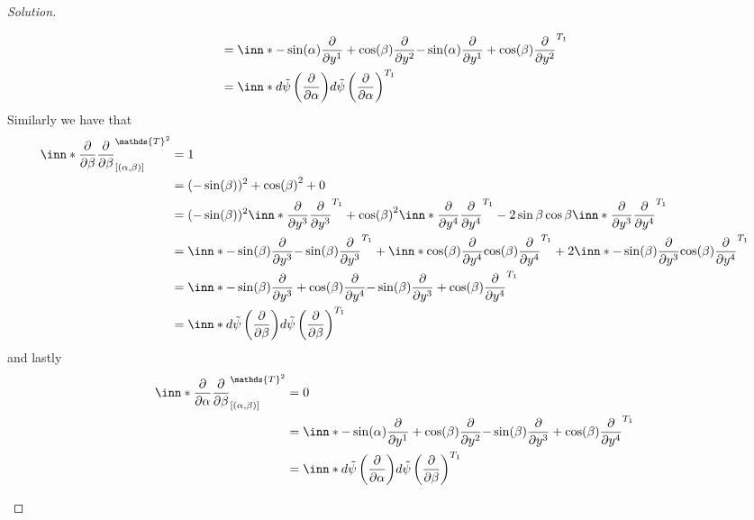 \documentclass[a4paper]{article}
\begin{document}
\begin{proof}[Solution]
\begin{enumerate}[(a)]
\[\begin{aligned}
                                                                              &= \inn*{-\sin(\alpha) \pdv{y^1} + \cos(\beta) \pdv{y^2}}{-\sin(\alpha) \pdv{y^1} + \cos(\beta) \pdv{y^2}}^{T_1} \\
                                                                              &= \inn*{d \tilde{\psi} \left( \pdv{\alpha} \right)}{d \tilde{\psi}\left( \pdv{\alpha}\right)}^{T_1}
        \end{aligned}
      \]
      Similarly we have that
      \[
        \begin{aligned}
          \inn*{\pdv{\beta}}{\pdv{\beta}}_{[(\alpha,\beta)]}^{\mathds{T}^2} &= 1 \\
                                                                              &= (-\sin(\beta))^2 + \cos(\beta)^2 + 0 \\
                                                                              &= (-\sin(\beta))^2\inn*{\pdv{y^3}}{\pdv{y^3}}^{T_1} + \cos(\beta)^2 \inn*{\pdv{y^4}}{\pdv{y^4}}^{T_1} - 2\sin{\beta}\cos{\beta} \inn*{\pdv{y^3}}{\pdv{y^4}}^{T_1} \\
                                                                              &= \inn*{-\sin(\beta)\pdv{y^3}}{-\sin(\beta) \pdv{y^3}}^{T_1} + \inn*{\cos(\beta)\pdv{y^4}}{\cos(\beta)\pdv{y^4}}^{T_1} + 2\inn*{-\sin(\beta) \pdv{y^3}}{\cos(\beta)\pdv{y^4}}^{T_1} \\
                                                                              &= \inn*{-\sin(\beta) \pdv{y^3} + \cos(\beta) \pdv{y^4}}{-\sin(\beta) \pdv{y^3} + \cos(\beta) \pdv{y^4}}^{T_1} \\
                                                                              &= \inn*{d \tilde{\psi} \left( \pdv{\beta} \right)}{d \tilde{\psi}\left( \pdv{\beta}\right)}^{T_1}
        \end{aligned}
      \]
      and lastly
      \[
        \begin{aligned}
          \inn*{\pdv{\alpha}}{\pdv{\beta}}_{[(\alpha, \beta)]}^{\mathds{T}^2} &= 0 \\
                                                                              &= \inn*{ -\sin(\alpha)\pdv{y^1} + \cos(\beta)\pdv{y^2}}{-\sin(\beta)\pdv{y^3} + \cos(\beta)\pdv{y^4}}^{T_1} \\
                                                                              &= \inn*{d \tilde{\psi} \left( \pdv{\alpha} \right)}{d \tilde{\psi}\left( \pdv{\beta}\right)}^{T_1}
        \end{aligned}
\]
\end{enumerate}
\end{proof}
\end{document}
